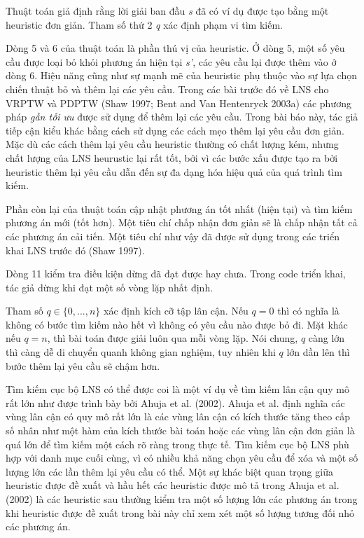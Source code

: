 Thuật toán giả định rằng lời giải ban đầu \textit{s} đã có ví dụ được tạo bằng một heuristic đơn giản. Tham số thứ 2 \textit{q} xác định phạm vi tìm kiếm. 

Dòng 5 và 6 của thuật toán là phần thú vị của heuristic. Ở dòng 5, một số yêu cầu được loại bỏ khỏi phương án hiện tại \textit{s'}, các yêu cầu lại được thêm vào ở dòng 6. Hiệu năng cũng như sự mạnh mẽ của heuristic phụ thuộc vào sự lựa chọn chiến thuật bỏ và thêm lại các yêu cầu. Trong các bài trước đó về LNS cho VRPTW và PDPTW (Shaw 1997; Bent and Van Hentenryck 2003a) các phương pháp \textit{gần tối ưu} được sử dụng để thêm lại các yêu cầu. Trong bài báo này, tác giả tiếp cận kiểu khác bằng cách sử dụng các cách mẹo thêm lại yêu cầu đơn giản. Mặc dù các cách thêm lại yêu cầu heuristic thường có chất lượng kém, nhưng chất lượng của LNS heurustic lại rất tốt, bởi vì các bước xấu được tạo ra bởi heuristic thêm lại yêu cầu dẫn đến sự đa dạng hóa hiệu quả của quá trình tìm kiếm. 

Phần còn lại của thuật toán cập nhật phương án tốt nhất (hiện tại) và tìm kiếm phương án mới (tốt hơn). Một tiêu chí chấp nhận đơn giản sẽ là chấp nhận tất cả các phương án cải tiến. Một tiêu chí như vậy đã được sử dụng trong các triển khai LNS trước đó (Shaw 1997).

Dòng 11 kiểm tra điều kiện dừng đã đạt được hay chưa. Trong code triển khai, tác giả dừng khi đạt một số vòng lặp nhất định.

Tham số $q \in \{0,...,n\}$ xác định kích cỡ tập lân cận. Nếu $q = 0$ thì có nghĩa là không có bước tìm kiếm nào hết vì không có yêu cầu nào được bỏ đi. Mặt khác nếu $q = n$, thì bài toán được giải luôn qua mỗi vòng lặp. Nói chung, $q$
càng lớn thì càng dễ di chuyển quanh không gian nghiệm, tuy nhiên khi $q$ lớn dần lên thì bước thêm lại yêu cầu sẽ chậm hơn. 

Tìm kiếm cục bộ LNS có thể được coi là một ví dụ về tìm kiếm lân cận quy mô rất lớn như được trình bày bởi Ahuja et al. (2002). Ahuja et al. định nghĩa các vùng lân cận có quy mô rất lớn là các vùng lân cận có kích thước tăng theo cấp số nhân như một hàm của kích thước bài toán hoặc các vùng lân cận đơn giản là quá lớn để tìm kiếm một cách rõ ràng trong thực tế. Tìm kiếm cục bộ LNS phù hợp với danh mục cuối cùng, vì có nhiều khả năng chọn yêu cầu để xóa và một số lượng lớn các lần thêm lại yêu cầu có thể. Một sự khác biệt quan trọng giữa heuristic được đề xuất và hầu hết các heuristic được mô tả trong Ahuja et al. (2002) là các heuristic sau thường kiểm tra một số lượng lớn các phương án trong khi heuristic được đề xuất trong bài này chỉ xem xét một số lượng tương đối nhỏ các phương án. 

